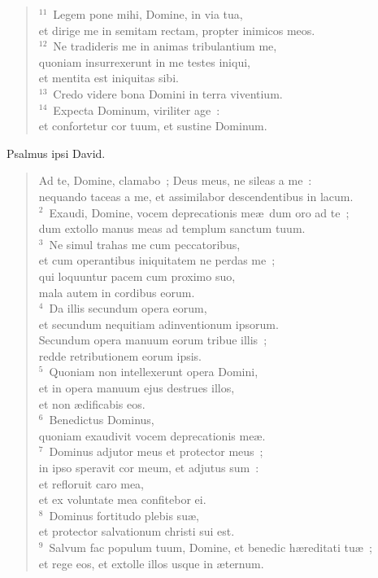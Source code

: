 \begin{flushleft}
\begin{verse}
${}^{11}$~Legem pone mihi, Domine, in via tua,\\ et dirige me in semitam rectam, propter inimicos meos.\\
${}^{12}$~Ne tradideris me in animas tribulantium me,\\ quoniam insurrexerunt in me testes iniqui,\\ et mentita est iniquitas sibi.\\
${}^{13}$~Credo videre bona Domini in terra viventium.\\
${}^{14}$~Expecta Dominum, viriliter age~:\\ et confortetur cor tuum, et sustine Dominum.\end{verse}\end{flushleft}



\bchapter
\lettrine[lines=3,image=true,loversize=0.05,lraise=-0.03]{P}{}salmus ipsi David. \begin{flushleft}\begin{verse}\vspace{6pt}Ad te, Domine, clamabo~; Deus meus, ne sileas a me~:\\ nequando taceas a me, et assimilabor descendentibus in lacum.\\
${}^{2}$~Exaudi, Domine, vocem deprecationis me\ae\ dum oro ad te~;\\ dum extollo manus meas ad templum sanctum tuum.\\
${}^{3}$~Ne simul trahas me cum peccatoribus,\\ et cum operantibus iniquitatem ne perdas me~;\\ qui loquuntur pacem cum proximo suo,\\ mala autem in cordibus eorum.\\
${}^{4}$~Da illis secundum opera eorum,\\ et secundum nequitiam adinventionum ipsorum.\\ Secundum opera manuum eorum tribue illis~;\\ redde retributionem eorum ipsis.\\
${}^{5}$~Quoniam non intellexerunt opera Domini,\\ et in opera manuum ejus destrues illos,\\ et non \ae dificabis eos.\\
${}^{6}$~Benedictus Dominus,\\ quoniam exaudivit vocem deprecationis me\ae .\\
${}^{7}$~Dominus adjutor meus et protector meus~;\\ in ipso speravit cor meum, et adjutus sum~:\\ et refloruit caro mea,\\ et ex voluntate mea confitebor ei.\\
${}^{8}$~Dominus fortitudo plebis su\ae ,\\ et protector salvationum christi sui est.\\
${}^{9}$~Salvum fac populum tuum, Domine, et benedic h\ae reditati tu\ae~;\\ et rege eos, et extolle illos usque in \ae ternum.\end{verse}\end{flushleft}
